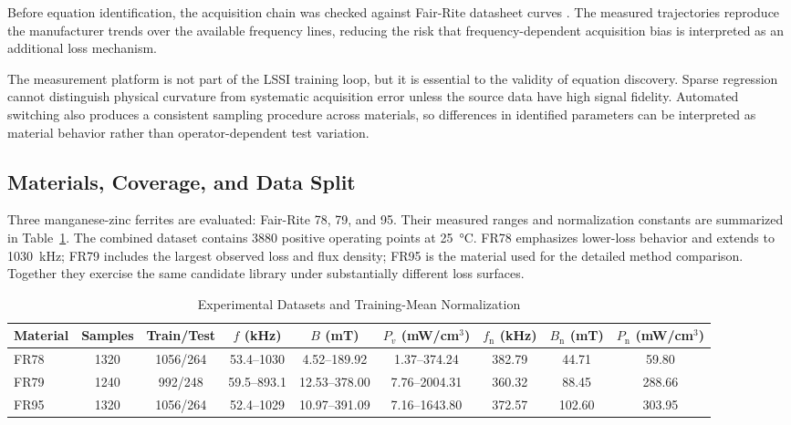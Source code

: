 \documentclass[lettersize,journal]{IEEEtran}
\begin{document}
Before equation identification, the acquisition chain was checked against Fair-Rite datasheet curves \cite{11121265}. The measured trajectories reproduce the manufacturer trends over the available frequency lines, reducing the risk that frequency-dependent acquisition bias is interpreted as an additional loss mechanism.

The measurement platform is not part of the LSSI training loop, but it is essential to the validity of equation discovery. Sparse regression cannot distinguish physical curvature from systematic acquisition error unless the source data have high signal fidelity. Automated switching also produces a consistent sampling procedure across materials, so differences in identified parameters can be interpreted as material behavior rather than operator-dependent test variation.

\subsection{Materials, Coverage, and Data Split}

Three manganese-zinc ferrites are evaluated: Fair-Rite 78, 79, and 95. Their measured ranges and normalization constants are summarized in Table~\ref{tab:data}. The combined dataset contains 3880 positive operating points at \SI{25}{\degreeCelsius}. FR78 emphasizes lower-loss behavior and extends to \SI{1030}{\kilo\hertz}; FR79 includes the largest observed loss and flux density; FR95 is the material used for the detailed method comparison. Together they exercise the same candidate library under substantially different loss surfaces.

\begin{table}[t]
\centering
\caption{Experimental Datasets and Training-Mean Normalization}
\label{tab:data}
\renewcommand{\arraystretch}{1.12}
\begin{tabular}{lcccccccc}
\toprule
Material & Samples & Train/Test & $f$ (kHz) & $B$ (mT) & $P_v$ (mW/cm$^3$) & $f_{\mathrm{n}}$ (kHz) & $B_{\mathrm{n}}$ (mT) & $P_{\mathrm{n}}$ (mW/cm$^3$) \\
\midrule
FR78 & 1320 & 1056/264 & 53.4--1030 & 4.52--189.92 & 1.37--374.24 & 382.79 & 44.71 & 59.80 \\
FR79 & 1240 & 992/248  & 59.5--893.1 & 12.53--378.00 & 7.76--2004.31 & 360.32 & 88.45 & 288.66 \\
FR95 & 1320 & 1056/264 & 52.4--1029 & 10.97--391.09 & 7.16--1643.80 & 372.57 & 102.60 & 303.95 \\
\bottomrule
\end{tabular}
\end{table}
\end{document}
